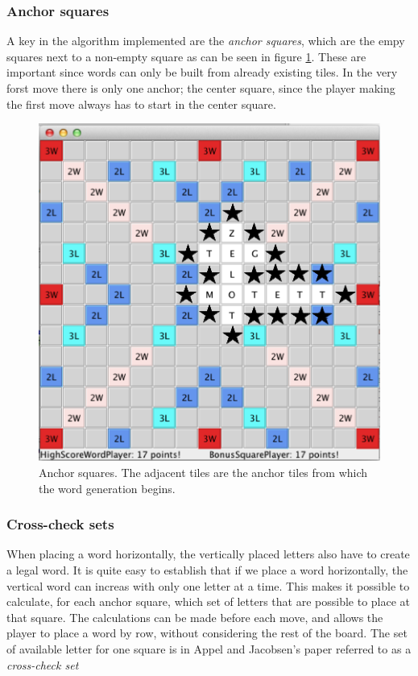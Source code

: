 \documentclass[a4paper, 12pt]{report}
\begin{document}
\subsubsection{Anchor squares}
A key in the algorithm implemented are the \emph{anchor squares}, which are the empy squares next to a non-empty square as can be seen in figure \ref{fig:anchors}. These are important since words can only be built from already existing tiles. In the very forst move there is only one anchor; the center square, since the player making the first move always has to start in the center square.

\begin{figure}
\centering
\includegraphics[scale=0.3]{anchors}
\caption{Anchor squares. The adjacent tiles are the anchor tiles from which the word generation begins.}
\label{fig:anchors}
\end{figure}

\subsubsection{Cross-check sets}
When placing a word horizontally, the vertically placed letters also have to create a legal word. It is quite easy to establish that if we place a word horizontally, the vertical word can increas with only one letter at a time. This makes it possible to calculate, for each anchor square, which set of letters that are possible to place at that square. The calculations can be made before each move, and allows the player to place a word by row, without considering the rest of the board. The set of available letter for one square is in Appel and Jacobsen's paper \cite{fastest} referred to as a \emph{cross-check set}
\end{document}
